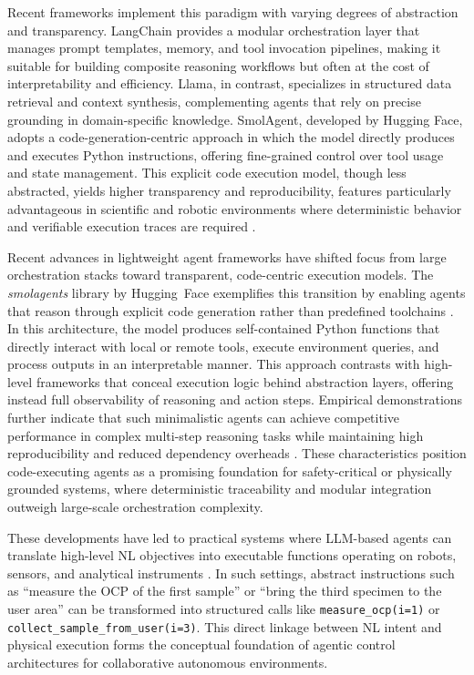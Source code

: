 Recent frameworks implement this paradigm with varying degrees of abstraction and transparency. LangChain provides a modular orchestration layer that manages prompt templates, memory, and tool invocation pipelines, making it suitable for building composite reasoning workflows but often at the cost of interpretability and efficiency. Llama, in contrast, specializes in structured data retrieval and context synthesis, complementing agents that rely on precise grounding in domain-specific knowledge. SmolAgent, developed by Hugging Face, adopts a code-generation-centric approach in which the model directly produces and executes Python instructions, offering fine-grained control over tool usage and state management. This explicit code execution model, though less abstracted, yields higher transparency and reproducibility, features particularly advantageous in scientific and robotic environments where deterministic behavior and verifiable execution traces are required \cite{towardsai2024comparison}.

Recent advances in lightweight agent frameworks have shifted focus from large orchestration stacks toward transparent, code-centric execution models. The \textit{smolagents} library by Hugging~Face exemplifies this transition by enabling agents that reason through explicit code generation rather than predefined toolchains \cite{huggingface_smolagents_good_agents}. In this architecture, the model produces self-contained Python functions that directly interact with local or remote tools, execute environment queries, and process outputs in an interpretable manner. This approach contrasts with high-level frameworks that conceal execution logic behind abstraction layers, offering instead full observability of reasoning and action steps. Empirical demonstrations further indicate that such minimalistic agents can achieve competitive performance in complex multi-step reasoning tasks while maintaining high reproducibility and reduced dependency overheads \cite{datacamp_smolagents_guide}. These characteristics position code-executing agents as a promising foundation for safety-critical or physically grounded systems, where deterministic traceability and modular integration outweigh large-scale orchestration complexity.


These developments have led to practical systems where LLM-based agents can translate high-level NL objectives into executable functions operating on robots, sensors, and analytical instruments \cite{huang2022language}. In such settings, abstract instructions such as “measure the OCP of the first sample” or “bring the third specimen to the user area” can be transformed into structured calls like \texttt{measure\_ocp(i=1)} or \texttt{collect\_sample\_from\_user(i=3)}. This direct linkage between NL intent and physical execution forms the conceptual foundation of agentic control architectures for collaborative autonomous environments.
